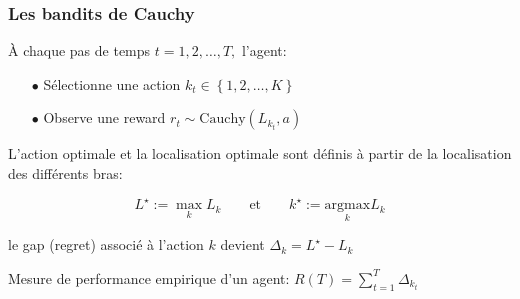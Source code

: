 \documentclass[8pt, sans]{beamer}
\begin{document}
\begin{frame}

\frametitle{Les bandits de Cauchy}

À chaque pas de temps $t=1,2,\ldots,T,$ l'agent:

\begin{itemize}

\item[$\bullet$] Sélectionne une action $k_t\in\left\{1,2,\ldots,K\right\}$

\item[$\bullet$] Observe une reward $r_t\sim \mathrm{Cauchy}(L_{k_t},a)$

\end{itemize}

\vfill
\pause

L'action optimale et la localisation optimale sont définis à partir de la localisation des différents bras:

\pause
$$\displaystyle L^{\star} := \max_k L_k \qquad \text{et} \qquad k^{\star} := \underset{k}{\mathrm{argmax}} L_k$$ 

\pause
\vfill

le gap (regret) associé à l'action $k$ devient $\Delta_k= L^{\star}-L_k$ 

\pause
\vfill

Mesure de performance empirique d'un agent: $\displaystyle R(T)=\sum_{t=1}^T \Delta_{k_t}$

\end{frame}
\end{document}
